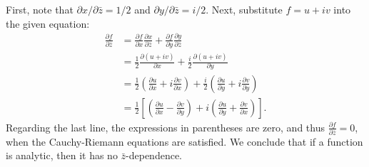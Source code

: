 \documentclass[11pt]{article}
\begin{document}
\begin{enumerate}
\begin{enumerate}
\begin{enumerate}
  \begin{mdframed}
  First, note that $\partial x/\partial \bar{z} = 1/2$ and $\partial y/\partial \bar{z} = i/2$. Next, substitute $f = u + iv$ into the given equation:
  \begin{align*}
    \frac{\partial f}{\partial \bar{z}} &= \frac{\partial f}{\partial x} \frac{\partial x}{\partial \bar{z}} + \frac{\partial f}{\partial y} \frac{\partial y}{\partial \bar{z}} \\
    &= \frac{1}{2}\frac{\partial(u + iv)}{\partial x} + \frac{i}{2}\frac{\partial (u + iv)}{\partial y} \\
    &= \frac{1}{2}\left(\frac{\partial u}{\partial x} +i\frac{\partial v}{\partial x}\right) + \frac{i}{2}\left(\frac{\partial u}{\partial y} +i\frac{\partial v}{\partial y}\right) \\
    &= \frac{1}{2}\left[\left(\frac{\partial u}{\partial x} - \frac{\partial v}{\partial y}\right) + i\left(\frac{\partial u}{\partial y} + \frac{\partial v}{\partial x}\right)\right].
  \end{align*}
  Regarding the last line, the expressions in parentheses are zero, and thus $\frac{\partial f}{\partial \bar{z}} = 0$, when the Cauchy-Riemann equations are satisfied. We conclude that if a function is analytic, then it has no $\bar{z}$-dependence.
  \end{mdframed}

  \end{enumerate}
\end{enumerate}

\end{enumerate}
\end{document}

